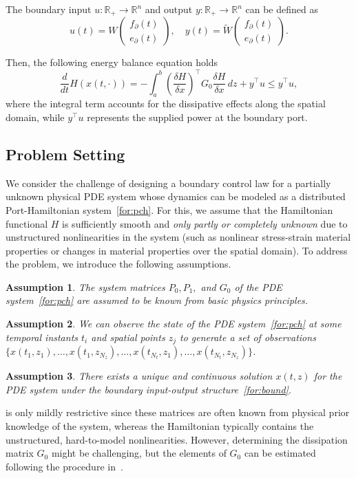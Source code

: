 \documentclass[letterpaper, 10 pt, conference]{ieeeconf}  %
\newcounter{part} %
\newtheorem{assum}{Assumption}
\newcommand{\R}{\mathbb{R}}
\begin{document}
The boundary input $u\colon\R_+\to\R^n$ and output $y\colon\R_+\to\R^n$ can be defined as
\begin{equation}
\label{for:bound}
u(t) = W
\begin{pmatrix}
f_{\partial}(t) \\
e_{\partial}(t)
\end{pmatrix},
\quad
y(t) = \widetilde{W}
\begin{pmatrix}
f_{\partial}(t) \\
e_{\partial}(t)
\end{pmatrix}.
\end{equation}

Then, the following energy balance equation holds
\begin{equation}
\frac{d}{dt}H(x(t,\cdot)) = - \int_a^b \left( \frac{\delta H}{\delta x} \right)^\top G_0 \frac{\delta H}{\delta x} \, dz + y^\top u \leq y^\top u,
\end{equation}
where the integral term accounts for the dissipative effects along the spatial domain, while $y^\top u$ represents the supplied power at the boundary port.

\subsection{Problem Setting}\label{sec:ps}
We consider the challenge of designing a boundary control law for a partially unknown physical PDE system whose dynamics can be modeled as a distributed Port-Hamiltonian system~\cref{for:pch}. For this, we assume that the Hamiltonian functional $H$ is sufficiently smooth and \emph{only partly or completely unknown} due to unstructured nonlinearities in the system (such as nonlinear stress-strain material properties or changes in material properties over the spatial domain). To address the problem, we introduce the following assumptions.
\begin{assum}\label{assum:1}
The system matrices $P_0, P_1,$ and $G_0$ of the PDE system~\cref{for:pch} are assumed to be known from basic physics principles. 
\end{assum}
\begin{assum}\label{assum:2}
We can observe the state of the PDE system~\cref{for:pch} at some temporal instants $t_i$ and spatial points $z_j$ to generate a set of observations $\{x(t_1,z_1),\ldots,x(t_1,z_{N_z}), \ldots, x(t_{N_t},z_1),\ldots,x(t_{N_t},z_{N_z})\}$.
\end{assum}
\begin{assum}\label{assum:3}
There exists a unique and continuous solution $x(t,z)$ for the PDE system under the boundary input-output structure~\cref{for:bound}.
\end{assum}
 is only mildly restrictive since these matrices are often known from physical prior knowledge of the system, whereas the Hamiltonian typically contains the unstructured, hard-to-model nonlinearities. However, determining the dissipation matrix $G_0$ might be challenging, but the elements of $G_0$ can be estimated following the procedure in~\cite{tan2024physics}.
\end{document}
